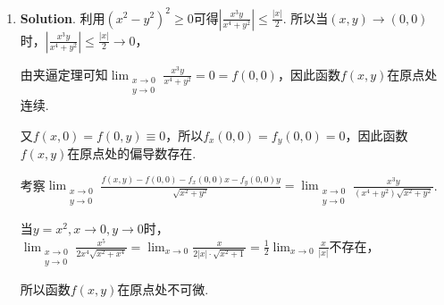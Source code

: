 \documentclass[../Main.tex]{subfiles}
\begin{document}
\begin{enumerate}
          所以$z(x,y) = x^{y}+x\int_{y}^{y+x}\mathrm{e}^{-u^2}\,\mathrm{d}u$，

          $\frac{\partial z}{\partial x}= yx^{y-1}+\int_{y}^{y+x}\mathrm{e}^{-u^2}\,\mathrm{d}
              u+x\cdot \mathrm{e}^{-(y+x)^2}$，
          \[
              \begin{aligned}
                  \frac{\partial^2 z}{\partial x \partial y}= & \frac{\partial}{\partial y}\left(yx^{y-1}+\int_{y}^{y+x}\mathrm{e}^{-u^2}\,\mathrm{d}u+x\cdot \mathrm{e}^{-(y+x)^2}\right) \\
                  =                                           & x^{y-1}+yx^{y-1}\ln x + \mathrm{e}^{-(y+x)^2}-\mathrm{e}^{-y^2}+x\cdot \mathrm{e}^{-(y+x)^2}\cdot (-2)(y+x)                \\
                  =                                           & x^{y-1}\left(1+y\ln x\right)+\mathrm{e}^{-(y+x)^2}\left(1-2x(y+x)\right)-\mathrm{e}^{-y^2}.
              \end{aligned}
          \]

          从而$\left.\frac{\partial^{2} z}{\partial x \partial y}\right|_{(1,0)}= -\frac{1}{\mathrm{e}}$.

    \item[14.] \textbf{Solution}. 利用$\left(x^{2}-y^{2}\right)^{2}\geq 0$可得$\left
              |\frac{x^{3} y}{x^{4} + y^{2}}\right| \leq \frac{|x|}{2}$. 所以当$(x,y)\to(
              0,0)$时，$\left|\frac{x^{3} y}{x^{4} + y^{2}}\right| \leq \frac{|x|}{2}\to0$，

          由夹逼定理可知$\lim_{\substack{x\to 0 \\ y\to 0}}\frac{x^{3} y}{x^{4} + y^{2}}
              =0=f(0,0)$，因此函数$f(x,y)$在原点处连续.

          又$f(x,0)=f(0,y)\equiv 0$，所以$f_{x}(0,0)=f_{y}(0,0)=0$，因此函数$f(x,y)$在原点处的偏导数存在.

          考察$\lim_{\substack{x\to 0 \\ y\to 0}}\frac{f(x,y)-f(0,0)-f_{x}(0,0)x-f_{y}(0,0)y}{\sqrt{x^{2}+y^{2}}}
              = \lim_{\substack{x\to 0 \\ y\to 0}}\frac{x^{3} y}{\left(x^{4} + y^{2}\right)\sqrt{x^2+y^2}}$.

          当$y=x^{2},x\to0,y\to0$时，$\lim_{\substack{x\to 0 \\ y\to 0}}\frac{x^{5}}{2x^{4}\sqrt{x^2+x^4}}
              = \lim_{x\to0}\frac{x}{2|x|\cdot\sqrt{x^2+1}}= \frac{1}{2}\lim_{x\to0}\frac{x}{|x|}$不存在，

          所以函数$f(x,y)$在原点处不可微.


\end{enumerate}
\end{document}
